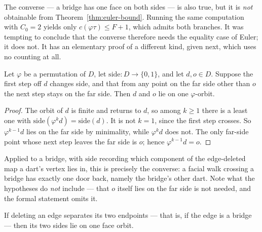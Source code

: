 \begin{remark}\label{rem:converse}
\Sprose
The converse --- a bridge has one face on both sides --- is also true, but
it is \emph{not} obtainable from Theorem~\ref{thm:euler-bound}. Running the
same computation with $C_0 = 2$ yields only $c(\varphi\tau) \le F + 1$,
which admits both branches. It was tempting to conclude that the converse
therefore needs the equality case of Euler; it does not. It has an
elementary proof of a different kind, given next, which uses no counting at
all.
\end{remark}

\begin{theorem}\label{thm:walk-lemma}
Let $\varphi$ be a permutation of $D$, let $\mathrm{side} \colon D \to
\{0,1\}$, and let $d, o \in D$. Suppose the first step off $d$ changes
side, and that from any point on the far side other than $o$ the next step
stays on the far side. Then $d$ and $o$ lie on one $\varphi$-orbit.
\end{theorem}

\begin{proof}
The orbit of $d$ is finite and returns to $d$, so among $k \ge 1$ there is a
least one with $\mathrm{side}(\varphi^k d) = \mathrm{side}(d)$. It is not
$k = 1$, since the first step crosses. So $\varphi^{k-1}d$ lies on the far
side by minimality, while $\varphi^{k}d$ does not. The only far-side point
whose next step leaves the far side is $o$; hence $\varphi^{k-1} d = o$.
\end{proof}

Applied to a bridge, with $\mathrm{side}$ recording which component of the
edge-deleted map a dart's vertex lies in, this is precisely the converse: a
facial walk crossing a bridge has exactly one door back, namely the bridge's
other dart. Note what the hypotheses do \emph{not} include --- that $o$
itself lies on the far side is not needed, and the formal statement omits
it.

\begin{theorem}\label{thm:converse-packaged}
If deleting an edge separates its two endpoints --- that is, if the edge is
a bridge --- then its two sides lie on one face orbit.
\end{theorem}

